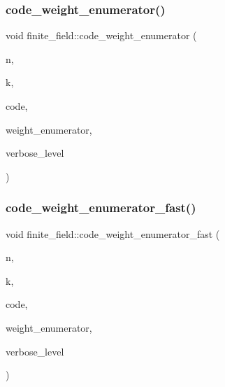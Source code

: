\mbox{\label{classfinite__field_aa41530e0d462000c8782eb7b4c69831d}} 
\subsubsection{\texorpdfstring{code\+\_\+weight\+\_\+enumerator()}{code\_weight\_enumerator()}}
{\footnotesize\ttfamily void finite\+\_\+field\+::code\+\_\+weight\+\_\+enumerator (\begin{DoxyParamCaption}\item[{\mbox{\hyperlink{galois_8h_a09fddde158a3a20bd2dcadb609de11dc}{I\+NT}}}]{n,  }\item[{\mbox{\hyperlink{galois_8h_a09fddde158a3a20bd2dcadb609de11dc}{I\+NT}}}]{k,  }\item[{\mbox{\hyperlink{galois_8h_a09fddde158a3a20bd2dcadb609de11dc}{I\+NT}} $\ast$}]{code,  }\item[{\mbox{\hyperlink{galois_8h_a09fddde158a3a20bd2dcadb609de11dc}{I\+NT}} $\ast$}]{weight\+\_\+enumerator,  }\item[{\mbox{\hyperlink{galois_8h_a09fddde158a3a20bd2dcadb609de11dc}{I\+NT}}}]{verbose\+\_\+level }\end{DoxyParamCaption})}

\mbox{\label{classfinite__field_ab31a0151b4717498b428ec266d3d354a}} 
\subsubsection{\texorpdfstring{code\+\_\+weight\+\_\+enumerator\+\_\+fast()}{code\_weight\_enumerator\_fast()}}
{\footnotesize\ttfamily void finite\+\_\+field\+::code\+\_\+weight\+\_\+enumerator\+\_\+fast (\begin{DoxyParamCaption}\item[{\mbox{\hyperlink{galois_8h_a09fddde158a3a20bd2dcadb609de11dc}{I\+NT}}}]{n,  }\item[{\mbox{\hyperlink{galois_8h_a09fddde158a3a20bd2dcadb609de11dc}{I\+NT}}}]{k,  }\item[{\mbox{\hyperlink{galois_8h_a09fddde158a3a20bd2dcadb609de11dc}{I\+NT}} $\ast$}]{code,  }\item[{\mbox{\hyperlink{galois_8h_a09fddde158a3a20bd2dcadb609de11dc}{I\+NT}} $\ast$}]{weight\+\_\+enumerator,  }\item[{\mbox{\hyperlink{galois_8h_a09fddde158a3a20bd2dcadb609de11dc}{I\+NT}}}]{verbose\+\_\+level }\end{DoxyParamCaption})}

